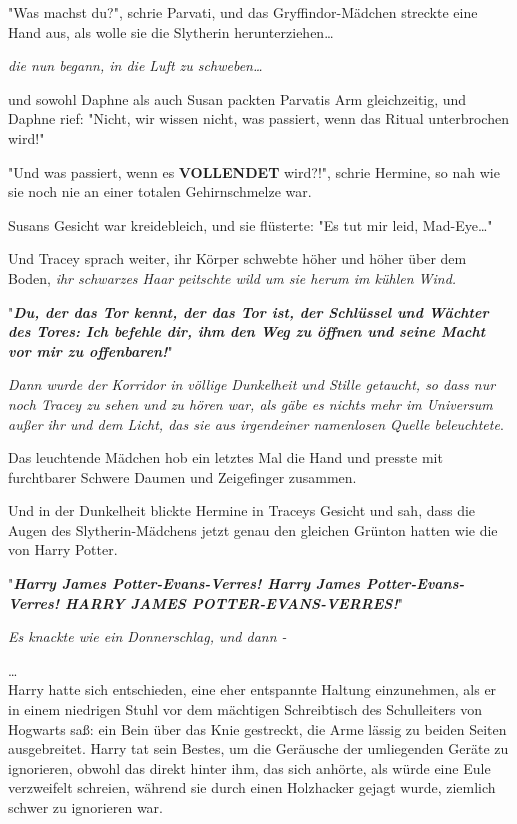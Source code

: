 {"Was machst du?", schrie Parvati, und das Gryffindor-Mädchen streckte eine Hand aus, als wolle sie die Slytherin herunterziehen…

\emph{die nun begann, in die Luft zu schweben…}

und sowohl Daphne als auch Susan packten Parvatis Arm gleichzeitig, und Daphne rief: "Nicht, wir wissen nicht, was passiert, wenn das Ritual unterbrochen wird!"

"Und was passiert, wenn es \textbf{VOLLENDET} wird?!", schrie Hermine, so nah wie sie noch nie an einer totalen Gehirnschmelze war.

Susans Gesicht war kreidebleich, und sie flüsterte: "Es tut mir leid, Mad-Eye…"

Und Tracey sprach weiter, ihr Körper schwebte höher und höher über dem Boden, \emph{ihr schwarzes Haar peitschte wild um sie herum im kühlen Wind.}

"\textbf{\emph{Du, der das Tor kennt, der das Tor ist, der Schlüssel und Wächter des Tores: Ich befehle dir, ihm den Weg zu öffnen und seine Macht vor mir zu offenbaren!}}"

\emph{Dann wurde der Korridor in völlige Dunkelheit und Stille getaucht, so dass nur noch Tracey zu sehen und zu hören war, als gäbe es nichts mehr im Universum außer ihr und dem Licht, das sie aus irgendeiner namenlosen Quelle beleuchtete}.

Das leuchtende Mädchen hob ein letztes Mal die Hand und presste mit furchtbarer Schwere Daumen und Zeigefinger zusammen.

Und in der Dunkelheit blickte Hermine in Traceys Gesicht und sah, dass die Augen des Slytherin-Mädchens jetzt genau den gleichen Grünton hatten wie die von Harry Potter.

"\textbf{\emph{Harry James Potter-Evans-Verres! Harry James Potter-Evans-Verres! HARRY JAMES POTTER-EVANS-VERRES!}}"

\emph{Es knackte wie ein Donnerschlag, und dann -}

…\\ Harry hatte sich entschieden, eine eher entspannte Haltung einzunehmen, als er in einem niedrigen Stuhl vor dem mächtigen Schreibtisch des Schulleiters von Hogwarts saß: ein Bein über das Knie gestreckt, die Arme lässig zu beiden Seiten ausgebreitet. Harry tat sein Bestes, um die Geräusche der umliegenden Geräte zu ignorieren, obwohl das direkt hinter ihm, das sich anhörte, als würde eine Eule verzweifelt schreien, während sie durch einen Holzhacker gejagt wurde, ziemlich schwer zu ignorieren war.

}
